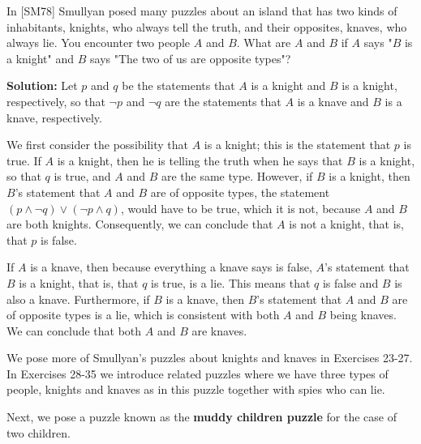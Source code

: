 \documentclass{Axon}
\begin{document}
\begin{example}
    In [SM78] Smullyan posed many puzzles about an island that has two kinds of inhabitants, knights, who always tell the truth, and their opposites, knaves, who always lie. You encounter two people \(A\) and \(B\). What are \(A\) and \(B\) if \(A\) says "\(B\) is a knight" and \(B\) says "The two of us are opposite types"?

    \noindent
    \textbf{Solution:}
    Let \(p\) and \(q\) be the statements that \(A\) is a knight and \(B\) is a knight, respectively, so that \(\lnot p\) and \(\lnot q\) are the statements that \(A\) is a knave and \(B\) is a knave, respectively.

    We first consider the possibility that \(A\) is a knight; this is the statement that \(p\) is true. If \(A\) is a knight, then he is telling the truth when he says that \(B\) is a knight, so that \(q\) is true, and \(A\) and \(B\) are the same type. However, if \(B\) is a knight, then  \(B\)'s statement that \(A\) and \(B\) are of opposite types, the statement \((p \land \lnot q) \lor (\lnot p \land q)\), would have to be true, which it is not, because \(A\) and \(B\) are both knights. Consequently, we can conclude that \(A\) is not a knight, that is, that \(p\) is false.

    If \(A\) is a knave, then because everything a knave says is false, \(A\)'s statement that \(B\) is a knight, that is, that \(q\) is true, is a lie. This means that \(q\) is false and \(B\) is also a knave. Furthermore, if \(B\) is a knave, then \(B\)'s statement that \(A\) and \(B\) are of opposite types is a lie, which is consistent with both \(A\) and \(B\) being knaves. We can conclude that both \(A\) and \(B\) are knaves.
\end{example}

We pose more of Smullyan's puzzles about knights and knaves in Exercises 23-27. In Exercises 28-35 we introduce related puzzles where we have three types of people, knights and knaves as in this puzzle together with spies who can lie.

Next, we pose a puzzle known as the \textbf{muddy children puzzle} for the case of two children.
\end{document}
